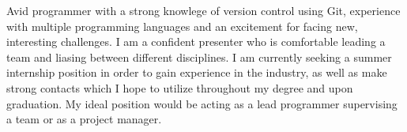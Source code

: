 

\begin{cvparagraph}
    Avid programmer with a strong knowlege of version control using Git, experience with multiple programming languages and an excitement for facing new, interesting challenges. I am a confident presenter who is comfortable leading a team and liasing between different disciplines. I am currently seeking a summer internship position in order to gain experience in the industry, as well as make strong contacts which I hope to utilize throughout my degree and upon graduation. My ideal position would be acting as a lead programmer supervising a team or as a project manager.
\end{cvparagraph}

